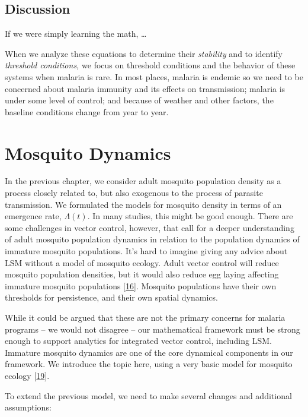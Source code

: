 \documentclass[
]{book}
\begin{document}
\hypertarget{discussion}{%
\section{Discussion}\label{discussion}}

If we were simply learning the math, \ldots{}

When we analyze these equations to determine their \emph{stability} and to identify \emph{threshold conditions,} we focus on threshold conditions and the behavior of these systems when malaria is rare. In most places, malaria is endemic so we need to be concerned about malaria immunity and its effects on transmission; malaria is under some level of control; and because of weather and other factors, the baseline conditions change from year to year.

\hypertarget{mosquito-dynamics}{%
\chapter{Mosquito Dynamics}\label{mosquito-dynamics}}

In the previous chapter, we consider adult mosquito population density as a process closely related to, but also exogenous to the process of parasite transmission. We formulated the models for mosquito density in terms of an emergence rate, \(\Lambda(t)\). In many studies, this might be good enough. There are some challenges in vector control, however, that call for a deeper understanding of adult mosquito population dynamics in relation to the population dynamics of immature mosquito populations. It's hard to imagine giving any advice about LSM without a model of mosquito ecology. Adult vector control will reduce mosquito population densities, but it would also reduce egg laying affecting immature mosquito populations {[}\protect\hyperlink{ref-BradyOJ2015AdultVector}{16}{]}. Mosquito populations have their own thresholds for persistence, and their own spatial dynamics.

While it could be argued that these are not the primary concerns for malaria programs -- we would not disagree -- our mathematical framework must be strong enough to support analytics for integrated vector control, including LSM. Immature mosquito dynamics are one of the core dynamical components in our framework. We introduce the topic here, using a very basic model for mosquito ecology {[}\protect\hyperlink{ref-SmithDL2013_LarvalDynamics}{19}{]}.

To extend the previous model, we need to make several changes and additional assumptions:
\end{document}
